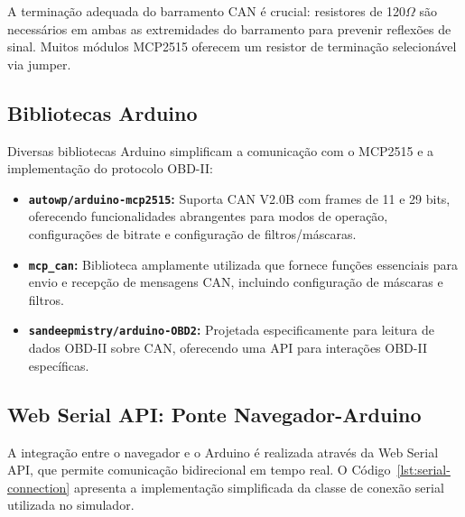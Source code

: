 A terminação adequada do barramento CAN é crucial: resistores de 120$\Omega$ são necessários em ambas as extremidades do barramento para prevenir reflexões de sinal. Muitos módulos MCP2515 oferecem um resistor de terminação selecionável via jumper.

\subsection{Bibliotecas Arduino}

Diversas bibliotecas Arduino simplificam a comunicação com o MCP2515 e a implementação do protocolo OBD-II:

\begin{itemize}
    \item \textbf{\texttt{autowp/arduino-mcp2515}:} Suporta CAN V2.0B com frames de 11 e 29 bits, oferecendo funcionalidades abrangentes para modos de operação, configurações de bitrate e configuração de filtros/máscaras.
    \item \textbf{\texttt{mcp\_can}:} Biblioteca amplamente utilizada que fornece funções essenciais para envio e recepção de mensagens CAN, incluindo configuração de máscaras e filtros.
    \item \textbf{\texttt{sandeepmistry/arduino-OBD2}:} Projetada especificamente para leitura de dados OBD-II sobre CAN, oferecendo uma API para interações OBD-II específicas.
\end{itemize}

\subsection{Web Serial API: Ponte Navegador-Arduino}

A integração entre o navegador e o Arduino é realizada através da Web Serial API, que permite comunicação bidirecional em tempo real. O Código~\ref{lst:serial-connection} apresenta a implementação simplificada da classe de conexão serial utilizada no simulador.

